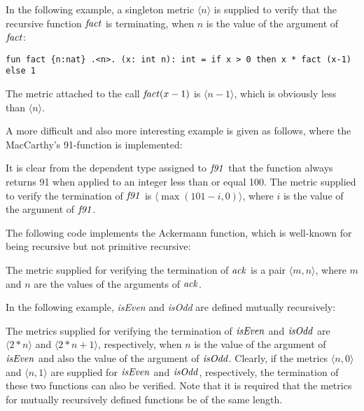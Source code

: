 In the following example, a singleton metric $\langle n\rangle$ is supplied
to verify that the recursive function ${\it fact}$ is terminating, when $n$
is the value of the argument of ${\it fact}$:
\begin{verbatim}
fun fact {n:nat} .<n>. (x: int n): int = if x > 0 then x * fact (x-1) else 1
\end{verbatim}
The metric attached to the call ${\it fact}(x-1)$ is $\langle n-1\rangle$,
which is obviously less than $\langle n\rangle$.

A more difficult and also more interesting example is given as follows,
where the MacCarthy's 91-function is implemented:

It is clear from the dependent type assigned to ${\it f91}$ that
the function always returns 91 when applied to an integer less than or
equal 100. The metric supplied to verify the termination of
${\it f91}$ is $\langle\max(101-i,0)\rangle$, where $i$ is the
value of the argument of ${\it f91}$.

The following code implements the Ackermann function, which is well-known
for being recursive but not primitive recursive:

The metric supplied for verifying the termination of ${\it ack}$ is
a pair $\langle m,n\rangle$, where $m$ and $n$ are the values of the
arguments of ${\it ack}$.

In the following example, {\it isEven} and {\it isOdd} are defined mutually
recursively:

The metrics supplied for verifying the termination of ${\it isEven}$ and
${\it isOdd}$ are $\langle 2*n\rangle$ and $\langle 2*n+1\rangle$,
respectively, when $n$ is the value of the argument of ${\it isEven}$ and
also the value of the argument of ${\it isOdd}$.  Clearly, if the metrics
$\langle n, 0\rangle$ and $\langle n, 1\rangle$ are supplied for ${\it
isEven}$ and ${\it isOdd}$, respectively, the termination of these two
functions can also be verified.  Note that it is required that the metrics
for mutually recursively defined functions be of the same length.

